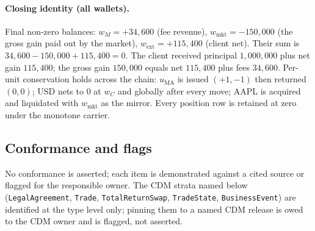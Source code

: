 \documentclass[11pt,a4paper]{article}
\begin{document}
\paragraph{Closing identity (all wallets).} Final non-zero balances: $w_M=+34{,}600$ (fee revenue),
$w_{\text{mkt}}=-150{,}000$ (the gross gain paid out by the market), $w_{\text{ext}}=+115{,}400$
(client net). Their sum is $34{,}600-150{,}000+115{,}400=0$. The client received principal
$1{,}000{,}000$ plus net gain $115{,}400$; the gross gain $150{,}000$ equals net $115{,}400$ plus
fees $34{,}600$. Per-unit conservation holds across the chain: $u_{\mathrm{MA}}$ is issued
$(+1,-1)$ then returned $(0,0)$; USD nets to $0$ at $w_C$ and globally after every move; AAPL is
acquired and liquidated with $w_{\text{mkt}}$ as the mirror. Every position row is retained at zero
under the monotone carrier.

\subsection{Conformance and flags}
\label{sec:managed-conformance}

No conformance is asserted; each item is demonstrated against a cited source or flagged for the
responsible owner. The CDM strata named below (\texttt{LegalAgreement}, \texttt{Trade},
\texttt{TotalReturnSwap}, \texttt{TradeState}, \texttt{BusinessEvent}) are identified at the type
level only; pinning them to a named CDM release is owed to the CDM owner and is flagged, not
asserted.
\end{document}

